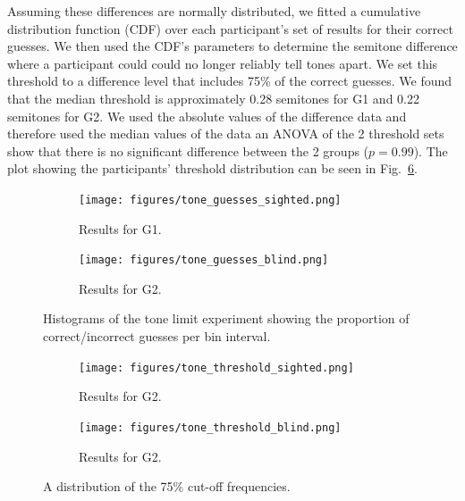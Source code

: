 \documentclass[sigconf, review=true, screen=true, anonymous=true]{acmart}
\begin{document}
Assuming these differences are normally distributed, we fitted a cumulative distribution function (CDF) over each participant's set of results for their correct guesses.
We then used the CDF's parameters to determine the semitone difference where a participant could could no longer reliably tell tones apart.
We set this threshold to a difference level that includes 75\% of the correct guesses.
We found that the median threshold is approximately 0.28 semitones for G1 and 0.22 semitones for G2.
We used the absolute values of the difference data and therefore used the median values of the data an ANOVA of the 2 threshold sets show that there is no significant difference between the 2 groups ($p=0.99$).
The plot showing the participants' threshold distribution can be seen in Fig.~\ref{fig:tone-threshold}. 

\begin{figure}
  \centering
  \begin{subfigure}[t]{0.5\textwidth}
    \centering
    \texttt{[image: figures/tone\_guesses\_sighted.png]}
    \caption{Results for G1. }
    \label{fig:tone-guesses-sighted}
  \end{subfigure}%
  \begin{subfigure}[t]{0.5\textwidth}
    \centering
    \texttt{[image: figures/tone\_guesses\_blind.png]}
    \caption{Results for G2. }
    \label{fig:cdf-semitone-blind}
  \end{subfigure}
  \caption{Histograms of the tone limit experiment showing the proportion of correct/incorrect guesses per bin interval. }
  \label{fig:tone-guesses}
\end{figure}

\begin{figure}
  \centering
  \begin{subfigure}[t]{0.5\textwidth}
    \centering
    \texttt{[image: figures/tone\_threshold\_sighted.png]}
    \caption{Results for G2. }
    \label{fig:tone-threshold}
  \end{subfigure}\hfill
  \begin{subfigure}[t]{0.5\textwidth}
    \centering
    \texttt{[image: figures/tone\_threshold\_blind.png]}
    \caption{Results for G2. }
    \label{fig:tone-threshold}
  \end{subfigure}\hfill
  \caption{A distribution of the 75\% cut-off frequencies. }
\end{figure}
\end{document}
